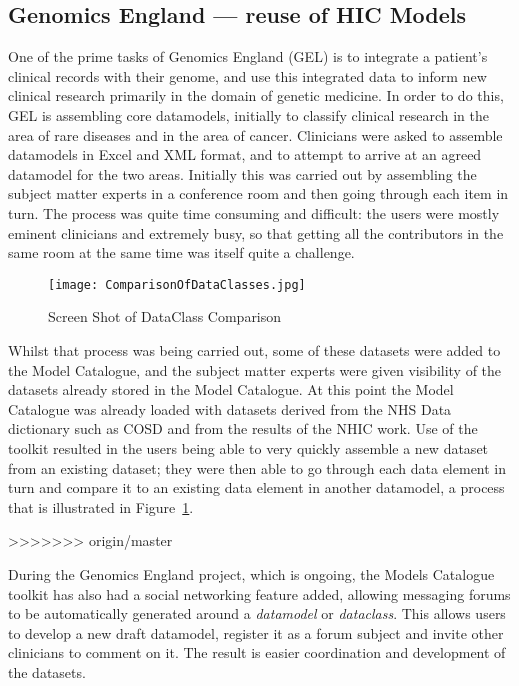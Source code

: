 \subsection{Genomics England --- reuse of HIC Models}

One of the prime tasks of Genomics England (GEL) is to integrate a patient's clinical records with their genome, and use this integrated data to inform new clinical research primarily in the domain of genetic medicine. In order to do this, GEL is assembling core datamodels, initially to classify clinical research in the area of rare diseases and in the area of cancer.  Clinicians were asked to assemble datamodels in Excel and XML format, and to attempt to arrive at an agreed datamodel for the two areas.  Initially this was carried out by assembling the subject matter experts in a conference room and then going through each item in turn. The process was quite time consuming and difficult: the users were mostly eminent clinicians and extremely busy, so that getting all the contributors in the same room at the same time was itself quite a challenge.


\begin{figure}[here]
	\texttt{[image: ComparisonOfDataClasses.jpg]}
	\caption{Screen Shot of DataClass Comparison} 
	\label{fig:dataClassComparison}	
\end{figure}

Whilst that process was being carried out, some of these datasets were added to the Model Catalogue, and the subject matter experts were given visibility of the datasets already stored in the Model Catalogue. At this point the Model Catalogue was already loaded with datasets derived from the NHS Data dictionary such as COSD and from the results of the NHIC work. Use of the toolkit resulted in the users being able to very quickly assemble a new dataset from an existing dataset; they were then able to go through each data element in turn and compare it to an existing data element in another datamodel, a process that is illustrated in Figure~\ref{fig:dataClassComparison}.


>>>>>>> origin/master



During the Genomics England project, which is ongoing, the Models Catalogue toolkit has also had a social networking feature added, allowing messaging forums to be automatically generated around a \emph{datamodel} or \emph{dataclass}. This allows users to develop a new draft datamodel, register it as a forum subject and invite other clinicians to comment on it. The result is easier coordination and development of the datasets. 

